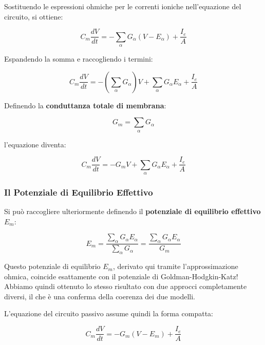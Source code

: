 Sostituendo le espressioni ohmiche per le correnti ioniche nell'equazione del circuito, si ottiene:

\begin{equation}
C_m \frac{dV}{dt} = -\sum_\alpha G_\alpha(V - E_\alpha) + \frac{I_e}{A}
\end{equation}

Espandendo la somma e raccogliendo i termini:

\begin{equation}
C_m \frac{dV}{dt} = -\left(\sum_\alpha G_\alpha\right) V + \sum_\alpha G_\alpha E_\alpha + \frac{I_e}{A}
\end{equation}

Definendo la \textbf{conduttanza totale di membrana}:

\begin{equation}
G_m = \sum_\alpha G_\alpha
\end{equation}

l'equazione diventa:

\begin{equation}
C_m \frac{dV}{dt} = -G_m V + \sum_\alpha G_\alpha E_\alpha + \frac{I_e}{A}
\end{equation}

\subsubsection{Il Potenziale di Equilibrio Effettivo}

Si può raccogliere ulteriormente definendo il \textbf{potenziale di equilibrio effettivo} $E_m$:

\begin{equation}
E_m = \frac{\sum_\alpha G_\alpha E_\alpha}{\sum_\alpha G_\alpha} = \frac{\sum_\alpha G_\alpha E_\alpha}{G_m}
\end{equation}

\begin{tcolorbox}[colback=gray!5, colframe=gray!40, arc=2mm, boxrule=0.5pt]
Questo potenziale di equilibrio $E_m$, derivato qui tramite l'approssimazione ohmica, coincide esattamente con il potenziale di Goldman-Hodgkin-Katz! Abbiamo quindi ottenuto lo stesso risultato con due approcci completamente diversi, il che è una conferma della coerenza dei due modelli.
\end{tcolorbox}

L'equazione del circuito passivo assume quindi la forma compatta:

\begin{equation}
C_m \frac{dV}{dt} = -G_m(V - E_m) + \frac{I_e}{A}
\end{equation}

